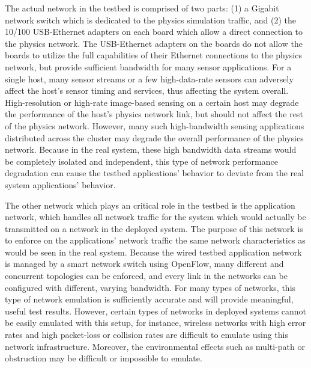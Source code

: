 The actual network in the testbed is comprised of two parts: (1) a Gigabit network switch which is dedicated to the physics simulation traffic, and (2) the 10/100 USB-Ethernet adapters on each board which allow a direct connection to the physics network.  The USB-Ethernet adapters on the boards do not allow the boards to utilize the full capabilities of their Ethernet connections to the physics network, but provide sufficient bandwidth for many sensor applications. For a single host, many sensor streams or a few high-data-rate sensors can adversely affect the host's sensor timing and services, thus affecting the system overall. High-resolution or high-rate image-based sensing on a certain host may degrade the performance of the host's physics network link, but should not affect the rest of the physics network. However, many such high-bandwidth sensing applications distributed across the cluster may degrade the overall performance of the physics network.  Because in the real system, these high bandwidth data streams would be completely isolated and independent, this type of network performance degradation can cause the testbed applications' behavior to deviate from the real system applications' behavior.  

The other network which plays an critical role in the testbed is the application network, which handles all network traffic for the system which would actually be transmitted on a network in the deployed system.  The purpose of this network is to enforce on the applications' network traffic the same network characteristics as would be seen in the real system.  Because the wired testbed application network is managed by a smart network switch using OpenFlow, many different and concurrent topologies can be enforced, and every link in the networks can be configured with different, varying bandwidth.  For many types of networks, this type of network emulation is sufficiently accurate and will provide meaningful, useful test results.  However, certain types of networks in deployed systems cannot be easily emulated with this setup, for instance, wireless networks with high error rates and high packet-loss or collision rates are difficult to emulate using this network infrastructure.  Moreover, the environmental effects such as multi-path or obstruction may be difficult or impossible to emulate.  

